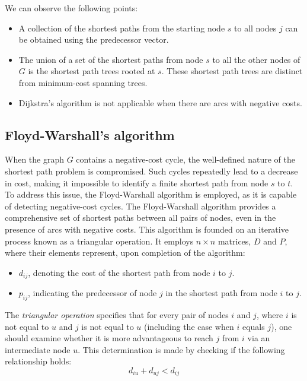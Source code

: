 We can observe the following points:
\begin{itemize}
    \item A collection of the shortest paths from the starting node $s$ to all nodes $j$ can be obtained using the predecessor vector.
    \item The union of a set of the shortest paths from node $s$ to all the other nodes of $G$ is the shortest path trees rooted at $s$. 
        These shortest path trees are distinct from minimum-cost spanning trees.
    \item Dijkstra's algorithm is not applicable when there are arcs with negative costs.
\end{itemize}

\subsection*{Floyd-Warshall's algorithm}
When the graph $G$ contains a negative-cost cycle, the well-defined nature of the shortest path problem is compromised. 
Such cycles repeatedly lead to a decrease in cost, making it impossible to identify a finite shortest path from node $s$ to $t$.
To address this issue, the Floyd-Warshall algorithm is employed, as it is capable of detecting negative-cost cycles.
The Floyd-Warshall algorithm provides a comprehensive set of shortest paths between all pairs of nodes, even in the presence of arcs with negative costs. 
This algorithm is founded on an iterative process known as a triangular operation.
It employs $n \times n$ matrices, $D$ and $P$, where their elements represent, upon completion of the algorithm:
\begin{itemize}
    \item $d_{ij}$, denoting the cost of the shortest path from node $i$ to $j$.
    \item $p_{ij}$, indicating the predecessor of node $j$ in the shortest path from node $i$ to $j$.
\end{itemize}

\begin{definition}
    The \emph{triangular operation} specifies that for every pair of nodes $i$ and $j$, where $i$ is not equal to $u$ and $j$ is not equal to $u$ (including the case when $i$ equals $j$), one should examine whether it is more advantageous to reach $j$ from $i$ via an intermediate node $u$. 
    This determination is made by checking if the following relationship holds:
    \[d_{iu}+d_{uj} < d_{ij}\]
\end{definition}

